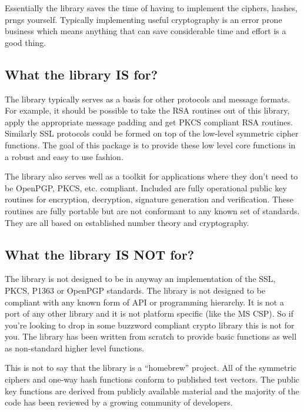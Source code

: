 \documentclass[b5paper]{book}
\begin{document}
Essentially the library saves the time of having to implement the ciphers, hashes, prngs yourself.  Typically implementing
useful cryptography is an error prone business which means anything that can save considerable time and effort is a good
thing.

\subsection{What the library IS for?}

The library typically serves as a basis for other protocols and message formats.  For example, it should be possible to 
take the RSA routines out of this library, apply the appropriate message padding and get PKCS compliant RSA routines.  
Similarly SSL protocols could be formed on top  of the low-level symmetric cipher functions.  The goal of this package is 
to provide these low level core functions in a robust and easy to use fashion.

The library also serves well as a toolkit for applications where they don't need to be OpenPGP, PKCS, etc. compliant.
Included are fully operational public key routines for encryption, decryption, signature generation and verification.  
These routines are fully portable but are not conformant to any known set of standards.  They are all based on established
number theory and cryptography.  

\subsection{What the library IS NOT for?}

The library is not designed to be in anyway an implementation of the SSL, PKCS, P1363 or OpenPGP standards.  The library 
is not designed to be compliant with any known form of API or programming hierarchy.  It is not a port of any other 
library and it is not platform specific (like the MS CSP).  So if you're looking to drop in some buzzword 
compliant crypto library this is not for you.  The library has been written from scratch to provide basic functions as 
well as non-standard higher level functions.  

This is not to say that the library is a ``homebrew'' project.  All of the symmetric ciphers and one-way hash functions
conform to published test vectors.  The public key functions are derived from publicly available material and the majority
of the code has been reviewed by a growing community of developers.
\end{document}

